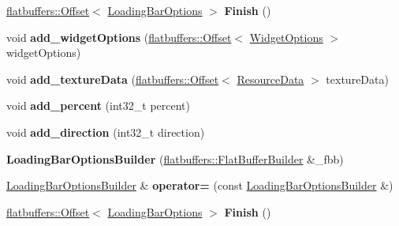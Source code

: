 \begin{DoxyCompactItemize}
\hyperlink{structflatbuffers_1_1Offset}{flatbuffers\+::\+Offset}$<$ \hyperlink{structflatbuffers_1_1LoadingBarOptions}{Loading\+Bar\+Options} $>$ {\bfseries Finish} ()
\item 
\mbox{\label{structflatbuffers_1_1LoadingBarOptionsBuilder_adf0a769841db4f139700bb84e4b49f47}} 
void {\bfseries add\+\_\+widget\+Options} (\hyperlink{structflatbuffers_1_1Offset}{flatbuffers\+::\+Offset}$<$ \hyperlink{structflatbuffers_1_1WidgetOptions}{Widget\+Options} $>$ widget\+Options)
\item 
\mbox{\label{structflatbuffers_1_1LoadingBarOptionsBuilder_a7d77c5fe41baf2930ab4a0792b44b970}} 
void {\bfseries add\+\_\+texture\+Data} (\hyperlink{structflatbuffers_1_1Offset}{flatbuffers\+::\+Offset}$<$ \hyperlink{structflatbuffers_1_1ResourceData}{Resource\+Data} $>$ texture\+Data)
\item 
\mbox{\label{structflatbuffers_1_1LoadingBarOptionsBuilder_ae08a302dd3662cc70126420715987d9a}} 
void {\bfseries add\+\_\+percent} (int32\+\_\+t percent)
\item 
\mbox{\label{structflatbuffers_1_1LoadingBarOptionsBuilder_aad38e11cda74ddb26fddcc98b4f7d4e3}} 
void {\bfseries add\+\_\+direction} (int32\+\_\+t direction)
\item 
\mbox{\label{structflatbuffers_1_1LoadingBarOptionsBuilder_a694cae599e5ed176c2c3f688d9467681}} 
{\bfseries Loading\+Bar\+Options\+Builder} (\hyperlink{classflatbuffers_1_1FlatBufferBuilder}{flatbuffers\+::\+Flat\+Buffer\+Builder} \&\+\_\+fbb)
\item 
\mbox{\label{structflatbuffers_1_1LoadingBarOptionsBuilder_ae1a179986c68257d8eecf4296600ee45}} 
\hyperlink{structflatbuffers_1_1LoadingBarOptionsBuilder}{Loading\+Bar\+Options\+Builder} \& {\bfseries operator=} (const \hyperlink{structflatbuffers_1_1LoadingBarOptionsBuilder}{Loading\+Bar\+Options\+Builder} \&)
\item 
\mbox{\label{structflatbuffers_1_1LoadingBarOptionsBuilder_a6832ecb93000ebbe1f6088d7c3691695}} 
\hyperlink{structflatbuffers_1_1Offset}{flatbuffers\+::\+Offset}$<$ \hyperlink{structflatbuffers_1_1LoadingBarOptions}{Loading\+Bar\+Options} $>$ {\bfseries Finish} ()
\end{DoxyCompactItemize}
